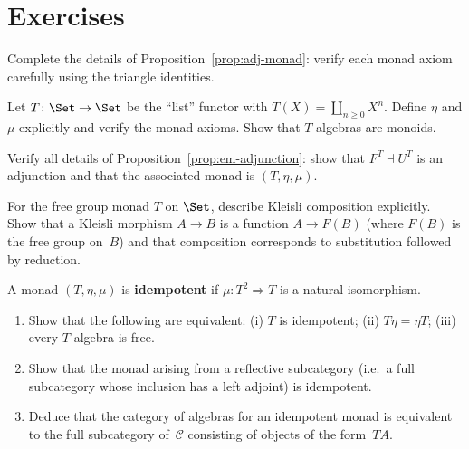 \section{Exercises}\label{sec:monad-exercises}

\begin{exercise}\label{exer:monad-triangle}
Complete the details of Proposition~\ref{prop:adj-monad}:
verify each monad axiom carefully using the triangle identities.
\end{exercise}

\begin{exercise}\label{exer:monad-list}
Let $T\colon\Set\to\Set$ be the ``list'' functor with
$T(X) = \coprod_{n\geq 0}X^n$.  Define $\eta$ and $\mu$ explicitly
and verify the monad axioms.  Show that $T$-algebras are monoids.
\end{exercise}

\begin{exercise}\label{exer:em-adjoint}
Verify all details of Proposition~\ref{prop:em-adjunction}: show that
$F^T\dashv U^T$ is an adjunction and that the associated monad is
$(T,\eta,\mu)$.
\end{exercise}

\begin{exercise}\label{exer:kleisli-composition}
For the free group monad $T$ on $\Set$, describe Kleisli composition
explicitly.  Show that a Kleisli morphism $A\to B$ is a function
$A\to F(B)$ (where $F(B)$ is the free group on~$B$) and that
composition corresponds to substitution followed by reduction.
\end{exercise}

\begin{exercise}\label{exer:idempotent-monad}
A monad $(T,\eta,\mu)$ is \textbf{idempotent} if
$\mu\colon T^2\Rightarrow T$ is a natural isomorphism.
\begin{enumerate}[label=(\alph*)]
\item Show that the following are equivalent: (i) $T$ is idempotent;
    (ii) $T\eta = \eta T$; (iii) every $T$-algebra is free.
\item Show that the monad arising from a reflective subcategory
    (i.e.\ a full subcategory whose inclusion has a left adjoint)
    is idempotent.
\item Deduce that the category of algebras for an idempotent monad
    is equivalent to the full subcategory of~$\mathcal{C}$ consisting
    of objects of the form~$TA$.
\end{enumerate}
\end{exercise}

